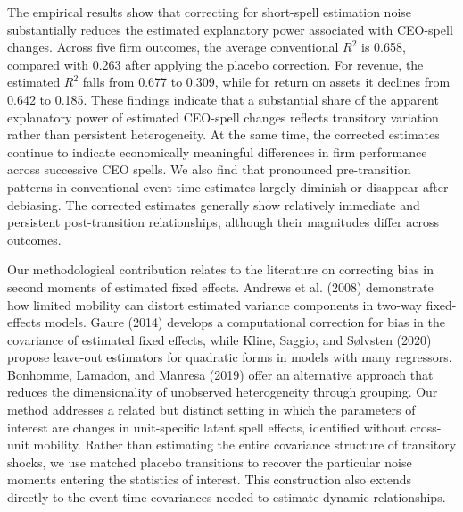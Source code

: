 \documentclass[sigconf,nonacm]{acmart}
\begin{document}
\medskip
\noindent{}
\medskip

The empirical results show that correcting for short-spell estimation
noise substantially reduces the estimated explanatory power associated
with CEO-spell changes. Across five firm outcomes, the average
conventional $R^2$ is 0.658, compared with 0.263 after applying the
placebo correction. For revenue, the estimated $R^2$ falls from 0.677
to 0.309, while for return on assets it declines from 0.642 to 0.185.
These findings indicate that a substantial share of the apparent
explanatory power of estimated CEO-spell changes reflects transitory
variation rather than persistent heterogeneity. At the same time, the
corrected estimates continue to indicate economically meaningful
differences in firm performance across successive CEO spells. We also
find that pronounced pre-transition patterns in conventional event-time
estimates largely diminish or disappear after debiasing. The corrected
estimates generally show relatively immediate and persistent
post-transition relationships, although their magnitudes differ across
outcomes.

Our methodological contribution relates to the literature on correcting
bias in second moments of estimated fixed effects. Andrews et al.
(2008) demonstrate how limited mobility can distort estimated variance
components in two-way fixed-effects models. Gaure (2014) develops a
computational correction for bias in the covariance of estimated fixed
effects, while Kline, Saggio, and S\o lvsten (2020) propose leave-out
estimators for quadratic forms in models with many regressors.
Bonhomme, Lamadon, and Manresa (2019) offer an alternative approach that
reduces the dimensionality of unobserved heterogeneity through grouping.
Our method addresses a related but distinct setting in which the
parameters of interest are changes in unit-specific latent spell effects,
identified without cross-unit mobility. Rather than estimating the
entire covariance structure of transitory shocks, we use matched
placebo transitions to recover the particular noise moments entering
the statistics of interest. This construction also extends directly to
the event-time covariances needed to estimate dynamic relationships.
\end{document}

